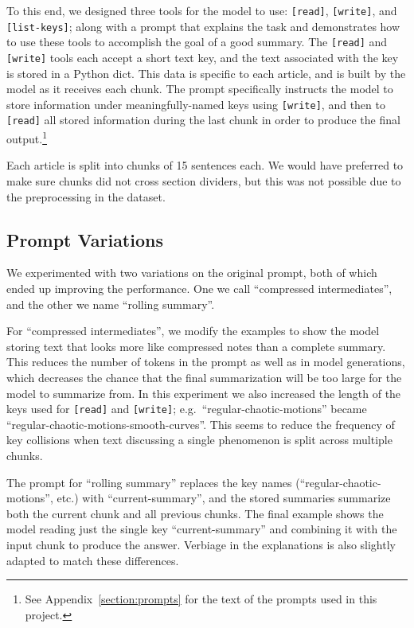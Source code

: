 \documentclass{article}
\begin{document}
To this end, we designed three tools for the model to use: \texttt{[read]}, \texttt{[write]}, and \texttt{[list-keys]}; along with a prompt that explains the task and demonstrates how to use these tools to accomplish the goal of a good summary. The \texttt{[read]} and \texttt{[write]} tools each accept a short text key, and the text associated with the key is stored in a Python dict. This data is specific to each article, and is built by the model as it receives each chunk. The prompt specifically instructs the model to store information under meaningfully-named keys using \texttt{[write]}, and then to \texttt{[read]} all stored information during the last chunk in order to produce the final output.\footnote{See Appendix~\ref{section:prompts} for the text of the prompts used in this project.}

Each article is split into chunks of 15 sentences each. We would have preferred to make sure chunks did not cross section dividers, but this was not possible due to the preprocessing in the dataset.

\subsection{Prompt Variations}

We experimented with two variations on the original prompt, both of which ended up improving the performance. One we call ``compressed intermediates'', and the other we name ``rolling summary''.

For ``compressed intermediates'', we modify the examples to show the model storing text that looks more like compressed notes than a complete summary. This reduces the number of tokens in the prompt as well as in model generations, which decreases the chance that the final summarization will be too large for the model to summarize from. In this experiment we also increased the length of the keys used for \texttt{[read]} and \texttt{[write]}; e.g.~``regular-chaotic-motions'' became ``regular-chaotic-motions-smooth-curves''. This seems to reduce the frequency of key collisions when text discussing a single phenomenon is split across multiple chunks.

The prompt for ``rolling summary'' replaces the key names (``regular-chaotic-motions'', etc.) with ``current-summary'', and the stored summaries summarize both the current chunk and all previous chunks. The final example shows the model reading just the single key ``current-summary'' and combining it with the input chunk to produce the answer. Verbiage in the explanations is also slightly adapted to match these differences.
\end{document}
